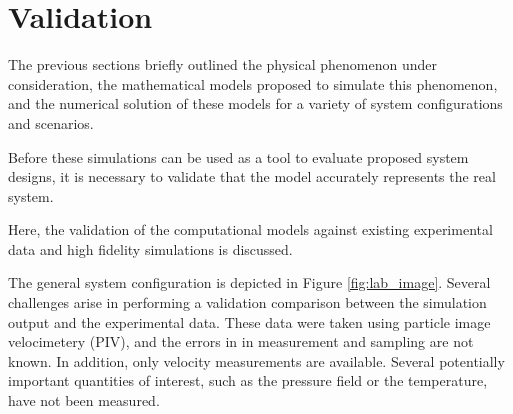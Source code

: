 
\section{Validation}
\label{sec:validation}

%
%

The previous sections briefly outlined the physical phenomenon under
consideration, the mathematical models proposed to simulate this phenomenon,
and the numerical solution of these models 
for a variety of system configurations and scenarios. 

Before these simulations can be used as a tool to evaluate proposed system 
designs, it is necessary to validate that the model accurately represents 
the real system. 

Here, the validation of the computational models
against existing experimental data and high fidelity simulations is 
discussed.

%
%

The general system configuration is depicted
in Figure \ref{fig:lab_image}. 
Several challenges arise in performing a validation comparison between the
simulation output and the experimental data. These data were taken using
particle image velocimetery (PIV), and the errors in 
in measurement and sampling are not known. 
In addition, only velocity measurements are available. Several
potentially important quantities of interest, such as the pressure field
or the temperature, have not been measured.





%
%
%
% 
%
%


